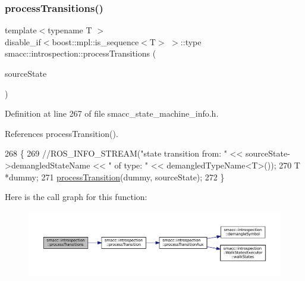 \subsubsection{\texorpdfstring{process\+Transitions()}{processTransitions()}\hspace{0.1cm}{\footnotesize\ttfamily [2/2]}}
{\footnotesize\ttfamily template$<$typename T $>$ \\
disable\+\_\+if$<$boost\+::mpl\+::is\+\_\+sequence$<$T$>$ $>$\+::type smacc\+::introspection\+::process\+Transitions (\begin{DoxyParamCaption}\item[{std\+::shared\+\_\+ptr$<$ \hyperlink{classsmacc_1_1introspection_1_1SmaccStateInfo}{Smacc\+State\+Info} $>$ \&}]{source\+State }\end{DoxyParamCaption})}



Definition at line 267 of file smacc\+\_\+state\+\_\+machine\+\_\+info.\+h.



References process\+Transition().


\begin{DoxyCode}
268 \{
269     \textcolor{comment}{//ROS\_INFO\_STREAM("state transition from: " << sourceState->demangledStateName << " of type: " <<
       demangledTypeName<T>());}
270     T *dummy;
271     \hyperlink{namespacesmacc_1_1introspection_a25f60bf498ae9f3d0324ed1b84ecbae4}{processTransition}(dummy, sourceState);
272 \}
\end{DoxyCode}
Here is the call graph for this function\+:
\nopagebreak
\begin{figure}[H]
\begin{center}
\leavevmode
\includegraphics[width=350pt]{namespacesmacc_1_1introspection_a24beffddf95fa3dce92051b336e65d8f_cgraph}
\end{center}
\end{figure}
\mbox{\label{namespacesmacc_1_1introspection_a48571b9bf3b115d2a83cc0147c96d0bd}} 
